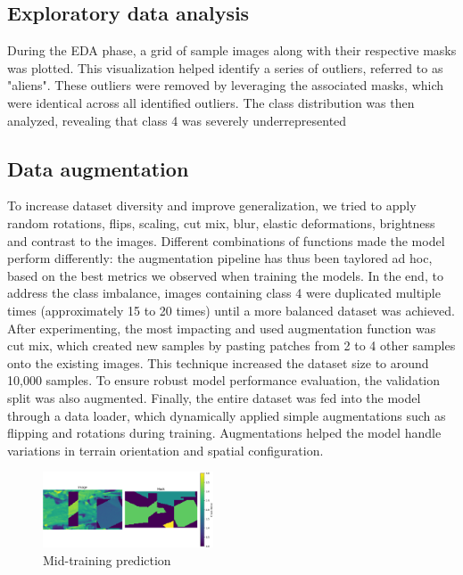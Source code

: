 \documentclass[11pt]{article}
\begin{document}
\begin{multicols}{2}
        \subsection{Exploratory data analysis}
        
        During the EDA phase, a grid of sample images along with their respective masks was plotted.
        This visualization helped identify a series of outliers, referred to as "aliens".
        These outliers were removed by leveraging the associated masks, which were identical across all identified outliers. 
        The class distribution was then analyzed, revealing that class 4 was severely underrepresented
        
        \subsection{Data augmentation}
        
        To increase dataset diversity and improve generalization, we tried to apply random rotations, flips, scaling, cut mix, blur, elastic deformations, brightness and contrast to the images. 
        Different combinations of functions made the model perform differently: the augmentation pipeline has thus been taylored ad hoc, based on the best metrics we observed when training the models.
        In the end, to address the class imbalance, images containing class 4 were duplicated multiple times (approximately 15 to 20 times) until a more balanced dataset was achieved.
        After experimenting, the most impacting and used augmentation function was cut mix, which created new samples by pasting patches from 2 to 4 other samples onto the existing images. 
        This technique increased the dataset size to around 10,000 samples.
        To ensure robust model performance evaluation, the validation split was also augmented.
        Finally, the entire dataset was fed into the model through a data loader, which dynamically applied simple augmentations such as flipping and rotations during training.
        Augmentations helped the model handle variations in terrain orientation and spatial configuration.

        \begin{figure}[H]
            \centering
            \includegraphics[width=0.45\textwidth]{reports/images/Augmented_image_mask.png}
            \caption{\small Mid-training prediction}
        \end{figure}
        

\end{multicols}
\end{document}
